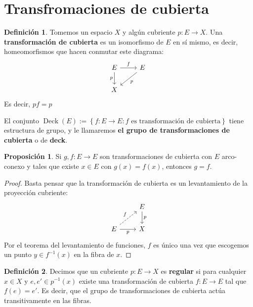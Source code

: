 \documentclass[spanish]{article}
\theoremstyle{definition}
\newtheorem*{defn}{Definición}
\newtheorem*{prop}{Proposición}
\newtheorem*{ejem}{Ejemplo}
\newcommand{\R}{\mathbb{R}}
\newcommand{\Z}{\mathbb{Z}}
\DeclareMathOperator{\Deck}{Deck}
\begin{document}
\section{Transfromaciones de cubierta}
\begin{defn}
	Tomemos un espacio $X$ y algún cubriente $p: E\to X$. Una \textbf{transformación de cubierta} es un isomorfismo de $ E$ en sí mismo, es decir, homeomorfismos que hacen conmutar este diagrama:
	\[\begin{tikzcd}
		 E\arrow[r,"f"]\arrow[d,swap,"p"]& E\arrow[dl,"p"]\\
		X
	\end{tikzcd}\]
	Es decir, $pf=p$
\end{defn}
El conjunto $\Deck( E):=\left\{f: E\to E:f\text{ es transformación de cubierta}\right\}$ tiene estructura de grupo, y le llamaremos \textbf{el grupo de transformaciones de cubierta} o de \textbf{deck}.
%	
\begin{prop}
	Si $g,f: E\to E$ son transformaciones de cubierta con $ E$ arco-conexo y tales que existe $x\in E$ con $g(x)=f(x)$, entonces $g=f$.
\end{prop}
\begin{proof}
	Basta pensar que la transformación de cubierta es un levantamiento de la proyección cubriente:
	\[\begin{tikzcd}
		& E\arrow[d,"p"]\\
		 E\arrow[ur,dashed,"f"]\arrow[r,swap,"p"]&X
	\end{tikzcd}\]
	Por el teorema del levantamiento de funciones, $f$ es único una vez que escogemos un punto $y\in f^{-1}(x)$ en la fibra de $x$.
\end{proof}
\begin{defn}
	Decimos que un cubriente $p: E\to X$ es \textbf{regular} si para cualquier $x\in X$ y $ e, e'\in p^{-1}(x)$ existe una transformación de cubierta $f: E\to E$ tal que $f( e)= e'$. Es decir, que el grupo de transformaciones de cubierta actúa transitivamente en las fibras.
\end{defn}
\end{document}
